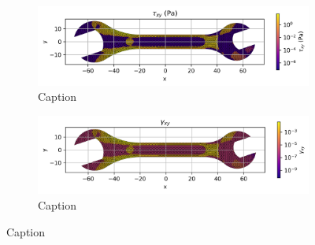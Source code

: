   \begin{figure}[H]
    \centering
    \begin{subfigure}[t]{0.49\textwidth}
      \centering
      \includegraphics[width=\textwidth]{GRAFICOS/Case b - tau_xy_per_element.png}
      \caption{Caption}
      \label{fig:deformada_reacciones}
    \end{subfigure}

    \hfill

    \begin{subfigure}[t]{0.49\textwidth}
      \centering
      \includegraphics[width=\textwidth]{GRAFICOS/Case b - gamma_xy_per_element.png}
      \caption{Caption}
      \label{fig:von_mises}
    \end{subfigure}
    \caption{Caption}
    \label{fig:analisis_estructural}
  \end{figure}

